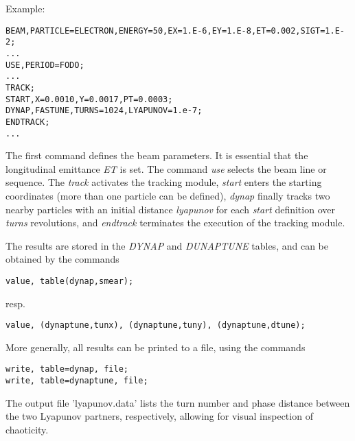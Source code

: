 Example:
\begin{verbatim}
BEAM,PARTICLE=ELECTRON,ENERGY=50,EX=1.E-6,EY=1.E-8,ET=0.002,SIGT=1.E-2;
...
USE,PERIOD=FODO;
...
TRACK;
START,X=0.0010,Y=0.0017,PT=0.0003;
DYNAP,FASTUNE,TURNS=1024,LYAPUNOV=1.e-7;
ENDTRACK;
...
\end{verbatim}

The first command defines the beam parameters. It is  essential that the
longitudinal emittance \textit{ET} is set. The command \textit{use}
selects the beam line or sequence. The \textit{track} activates the
tracking module, \textit{start } enters the starting coordinates (more
than one particle can be defined),  \textit{dynap} finally tracks two
nearby particles  with an initial distance \textit{lyapunov}  for each
\textit{start} definition over \textit{ turns } revolutions, and
\textit{endtrack} terminates the execution of the tracking module. 

The results are stored in the \textit{DYNAP} and \textit{DUNAPTUNE}
tables, and can be obtained by the commands  
 
\begin{verbatim}
value, table(dynap,smear);
\end{verbatim} 
resp. 
\begin{verbatim}
value, (dynaptune,tunx), (dynaptune,tuny), (dynaptune,dtune);
\end{verbatim}

More generally, all results can be printed to a file, using the commands 
 
\begin{verbatim}
write, table=dynap, file;
write, table=dynaptune, file;
\end{verbatim}

The output file 'lyapunov.data' lists  the turn number and phase
distance between the  two Lyapunov partners, respectively, allowing for
visual inspection of chaoticity. 
 
